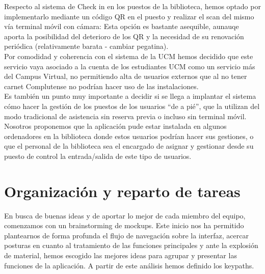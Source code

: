 \documentclass[12pt]{article}
\begin{document}
Respecto al sistema de Check in en los puestos de la biblioteca, hemos optado por implementarlo mediante un código QR en el puesto y realizar el scan del mismo vía terminal móvil con cámara: Esta opción es bastante asequible, aunauqe aporta la posibilidad del deterioro de los QR y la necesidad de su renovación periódica (relativamente barata - cambiar pegatina).\\ 

Por comodidad y coherencia con el sistema de la UCM hemos decidido que este servicio vaya asociado a la cuenta de los estudiantes UCM como un servicio más del Campus Virtual, no permitiendo alta de usuarios externos que al no tener carnet Complutense no podrían hacer uso de las instalaciones. \\

Es también un punto muy importante a decidir si se llega a implantar el sistema cómo hacer la gestión de los puestos de los usuarios “de a pié”, que la utilizan del modo tradicional de asistencia sin reserva previa o incluso sin terminal móvil. Nosotros proponemos que la aplicación pude estar instalada en algunos ordenadores en la biblioteca donde estos usuarios podrían hacer sus gestiones, o que el personal de la biblioteca sea el encargado de asignar y gestionar desde su puesto de control la entrada/salida de este tipo de usuarios.
\newpage


\section{Organización y reparto de tareas}
En busca de buenas ideas y de aportar lo mejor de cada miembro del equipo, comenzamos con un brainstorming de mockups. Este inicio nos ha permitido plantearnos de forma profunda el flujo de navegación sobre la interfaz, acercar posturas en cuanto al tratamiento de las funciones principales y ante la explosión de material, hemos escogido las mejores ideas para agrupar y presentar las funciones de la aplicación. A partir de este análisis hemos definido los keypaths.
\end{document}
